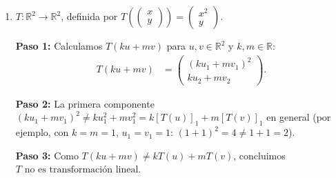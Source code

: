 \begin{example}
\begin{enumerate}
    \begin{myproof}
    \textbf{Paso 1:} Sean $u(x) = \sum_{i=0}^3 a_i x^i$ y $v(x) = \sum_{i=0}^3 b_i x^i$, con $k, m \in \mathbb{R}$.

    \textbf{Paso 2:} Por la linealidad de la derivada:
    \begin{align*}
        T(ku + mv) &= (ku + mv)' = k u'(x) + m v'(x) = kT(u) + mT(v).
    \end{align*}

    \textbf{Paso 3:} Concluimos $\boxed{T \text{ es transformación lineal}}$.
    \end{myproof}

    \item $T:\mathbb{R}^2 \to \mathbb{R}^2$, definida por $T\left(\begin{pmatrix}x\\y\end{pmatrix}\right) = \begin{pmatrix}x^2 \\ y\end{pmatrix}$.

    \begin{myproof}
    \textbf{Paso 1:} Calculamos $T(ku + mv)$ para $u, v \in \mathbb{R}^2$ y $k, m \in \mathbb{R}$:
    \begin{align*}
        T(ku + mv) &= \begin{pmatrix}(ku_1 + mv_1)^2 \\ ku_2 + mv_2\end{pmatrix}.
    \end{align*}

    \textbf{Paso 2:} La primera componente $(ku_1 + mv_1)^2 \neq ku_1^2 + mv_1^2 = k[T(u)]_1 + m[T(v)]_1$ en general (por ejemplo, con $k=m=1$, $u_1=v_1=1$: $(1+1)^2=4\neq 1+1=2$).

    \textbf{Paso 3:} Como $T(ku+mv)\neq kT(u)+mT(v)$, concluimos $\boxed{T \text{ no es transformación lineal}}$.
    \end{myproof}
\end{enumerate}
\end{example}


